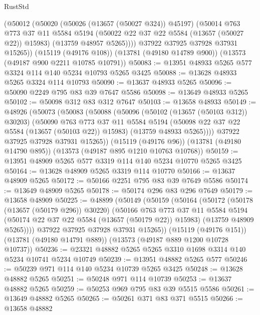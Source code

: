 \begin{lexlean}{RustStd}
\begin{coremodule}
        (@50012
          (@50020
            (@50026 (@13657 (@50027 @324)) @45197)
            (@50014
              @763
              @773
              @37
              @11
              @5584
              @5194
              (@50022 @22 @37 @22 @5584 (@13657 (@50027 @22)) @15983)
              (@13759 @48957 @5265))))
        @37922
        @37925
        @37928
        @37931
        @15265))
    (@15119 (@49176 @108))
    (@13781 (@49180 @14789 @900))
    (@13573 (@49187 @900 @2211 @10785 @10791))
@50083 := @13951 @48933 @5265 @577 @3324 @114 @140 @5234 @10793 @5265 @3425
@50088 := @13628 @48933 @5265 @3324 @114 @10793
@50090 := @13637 @48933 @5265
@50096 := @50090 @2249 @795 @83 @39 @7647 @5586
@50098 := @13649 @48933 @5265
@50102 := @50098 @312 @83 @312 @7647
@50103 := @13658 @48933
@50149 := @48926
    (@50073
      (@50083
        (@50088
          (@50096
            (@50102 (@13657 (@50103 @312)) @30203)
            (@50090
              @763
              @773
              @37
              @11
              @5584
              @5194
              (@50098 @22 @37 @22 @5584 (@13657 (@50103 @22)) @15983)
              (@13759 @48933 @5265))))
        @37922
        @37925
        @37928
        @37931
        @15265))
    (@15119 (@49176 @96))
    (@13781 (@49180 @14790 @895))
    (@13573 (@49187 @895 @1210 @10763 @10768))
@50159 := @13951 @48909 @5265 @577 @3319 @114 @140 @5234 @10770 @5265 @3425
@50164 := @13628 @48909 @5265 @3319 @114 @10770
@50166 := @13637 @48909 @5265
@50172 := @50166 @2251 @795 @83 @39 @7649 @5586
@50174 := @13649 @48909 @5265
@50178 := @50174 @296 @83 @296 @7649
@50179 := @13658 @48909
@50225 := @48899
    (@50149
      (@50159
        (@50164
          (@50172
            (@50178 (@13657 (@50179 @296)) @30220)
            (@50166
              @763
              @773
              @37
              @11
              @5584
              @5194
              (@50174 @22 @37 @22 @5584 (@13657 (@50179 @22)) @15983)
              (@13759 @48909 @5265))))
        @37922
        @37925
        @37928
        @37931
        @15265))
    (@15119 (@49176 @151))
    (@13781 (@49180 @14791 @889))
    (@13573 (@49187 @889 @1200 @10728 @10737))
@50236 := @23321 @48882 @5265 @5265 @3310 @1698 @3314 @140 @5234 @10741 @5234 @10749
@50239 := @13951 @48882 @5265 @577
@50246 := @50239 @971 @114 @140 @5234 @10739 @5265 @3425
@50248 := @13628 @48882 @5265
@50251 := @50248 @971 @114 @10739
@50253 := @13637 @48882 @5265
@50259 := @50253 @969 @795 @83 @39 @5515 @5586
@50261 := @13649 @48882 @5265
@50265 := @50261 @371 @83 @371 @5515
@50266 := @13658 @48882

\end{coremodule}
\end{lexlean}
